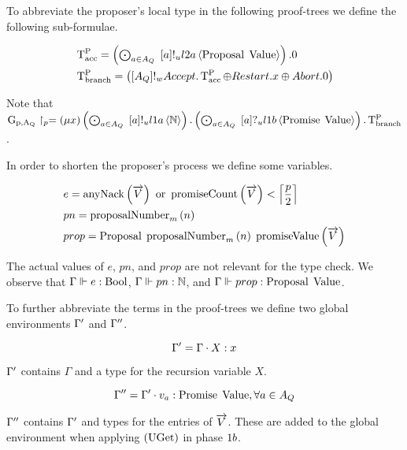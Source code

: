 To abbreviate the proposer's local type in the following proof-trees we define the following sub-formulae.

\begin{align*}
&\TpAccept = \DotForall{\AcceptorIndex\in\AQ}{\SendUnreliableL{\AcceptorIndex}{\LTwoA}{\Proposal{\Value}}}.\End\\
&\TpBranch = \SendWeaklyL{\AQ}{\Accept . \TpAccept \oplus \Restart . x \oplus \Abort .\End}
\end{align*}

Note that $\GlobalTypeProjection{\ProposerIndex} = \Mu{x}
\DotForall{\AcceptorIndex\in\AQ}{\SendUnreliableL{\AcceptorIndex}{\LOneA}{\mathbb{N}}} .
\DotForall{\AcceptorIndex\in\AQ}{\ReceiveUnreliableL{\AcceptorIndex}{\LOneB}{\Promise{\Value}}} . \TpBranch$.

In order to shorten the proposer's process we define some variables.

\begin{align*}
&e = \anyNack{\VectorV} \tOr \promiseCount{\VectorV} < \ceil{\frac{\ProposerIndex}{2}}\\
&pn = \proposalNumber{n}{m}\\
&prop = \ProposalC{\proposalNumber{n}{m}}{\promiseValue{\VectorV}}
\end{align*}

The actual values of $e$, $pn$, and $prop$ are not relevant for the type check.
We observe that $\GammaSatisfiesType{e}{\Bool}$, $\GammaSatisfiesType{pn}{\mathbb{N}}$, and $\GammaSatisfiesType{prop}{\Proposal{\Value}}$.

To further abbreviate the terms in the proof-trees we define two global environments $\GammaX$ and $\GammaXV$.

\[\GammaX=\Gamma\cdot\GEnvEntry{X}{x}\]

$\GammaX$ contains $\Gamma$ and a type for the recursion variable $X$.

\[\GammaXV = \GammaX \cdot \GEnvEntry{v_{\AcceptorIndex}}{\Promise{\Value}},\forall\AcceptorIndex\in\AQ\]

$\GammaXV$ contains $\GammaX$ and types for the entries of $\VectorV$.
These are added to the global environment when applying $\RUget$ in phase $\POneB$.

